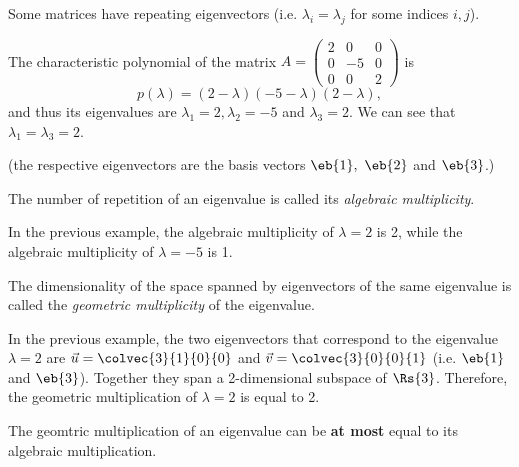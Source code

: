 Some matrices have repeating eigenvectors (i.e. $\lambda_{i}=\lambda_{j}$ for some indices $i,j$).
\begin{example}
  The characteristic polynomial of the matrix $A=\begin{pmatrix} 2 & 0 & 0 \\ 0 & -5 & 0 \\ 0 & 0 & 2 \end{pmatrix}$ is
  \begin{equation*}
	p(\lambda) = \left( 2-\lambda \right)\left( -5-\lambda \right)\left( 2-\lambda \right),
  \end{equation*}
  and thus its eigenvalues are $\lambda_{1}=2, \lambda_{2}=-5$ and $\lambda_{3}=2$. We can see that $\lambda_{1}=\lambda_{3}=2$.

  (the respective eigenvectors are the basis vectors $\eb{1},\ \eb{2}$ and $\eb{3}$.)
\end{example}

The number of repetition of an eigenvalue is called its \emph{algebraic multiplicity}.
\begin{example}
  In the previous example, the algebraic multiplicity of $\lambda=2$ is 2, while the algebraic multiplicity of $\lambda=-5$ is 1. 
\end{example}

The dimensionality of the space spanned by eigenvectors of the same eigenvalue is called the \emph{geometric multiplicity} of the eigenvalue.
\begin{example}
  In the previous example, the two eigenvectors that correspond to the eigenvalue $\lambda=2$ are $\vec{u}=\colvec{3}{1}{0}{0}$ and $\vec{v}=\colvec{3}{0}{0}{1}$ (i.e. $\eb{1}$ and $\eb{3}$). Together they span a 2-dimensional subspace of $\Rs{3}$. Therefore, the geometric multiplication of $\lambda=2$ is equal to 2.
\end{example}

The geomtric multiplication of an eigenvalue can be \textbf{at most} equal to its algebraic multiplication.

